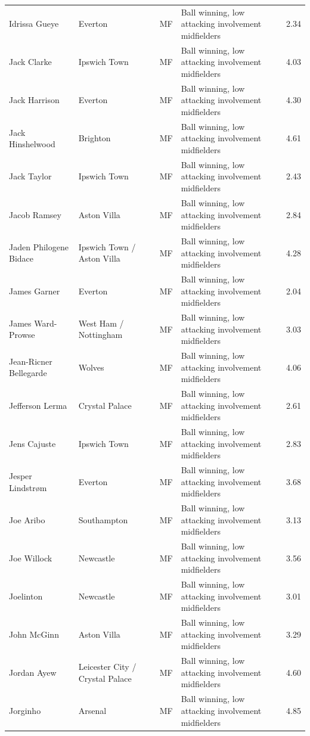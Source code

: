 \begin{longtable}{p{3.4cm}p{2.5cm}p{1.0cm}p{5.0cm}r}
Idrissa Gueye & Everton & MF & Ball winning, low attacking involvement midfielders & 2.34 \\
Jack Clarke & Ipswich Town & MF & Ball winning, low attacking involvement midfielders & 4.03 \\
Jack Harrison & Everton & MF & Ball winning, low attacking involvement midfielders & 4.30 \\
Jack Hinshelwood & Brighton & MF & Ball winning, low attacking involvement midfielders & 4.61 \\
Jack Taylor & Ipswich Town & MF & Ball winning, low attacking involvement midfielders & 2.43 \\
Jacob Ramsey & Aston Villa & MF & Ball winning, low attacking involvement midfielders & 2.84 \\
Jaden Philogene Bidace & Ipswich Town / Aston Villa & MF & Ball winning, low attacking involvement midfielders & 4.28 \\
James Garner & Everton & MF & Ball winning, low attacking involvement midfielders & 2.04 \\
James Ward-Prowse & West Ham / Nottingham & MF & Ball winning, low attacking involvement midfielders & 3.03 \\
Jean-Ricner Bellegarde & Wolves & MF & Ball winning, low attacking involvement midfielders & 4.06 \\
Jefferson Lerma & Crystal Palace & MF & Ball winning, low attacking involvement midfielders & 2.61 \\
Jens Cajuste & Ipswich Town & MF & Ball winning, low attacking involvement midfielders & 2.83 \\
Jesper Lindstrøm & Everton & MF & Ball winning, low attacking involvement midfielders & 3.68 \\
Joe Aribo & Southampton & MF & Ball winning, low attacking involvement midfielders & 3.13 \\
Joe Willock & Newcastle & MF & Ball winning, low attacking involvement midfielders & 3.56 \\
Joelinton & Newcastle & MF & Ball winning, low attacking involvement midfielders & 3.01 \\
John McGinn & Aston Villa & MF & Ball winning, low attacking involvement midfielders & 3.29 \\
Jordan Ayew & Leicester City / Crystal Palace & MF & Ball winning, low attacking involvement midfielders & 4.60 \\
Jorginho & Arsenal & MF & Ball winning, low attacking involvement midfielders & 4.85 \\

\end{longtable}

